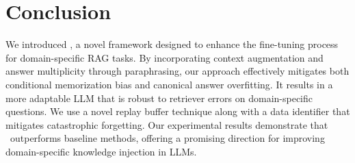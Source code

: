 \section{Conclusion}\label{sec:conclusion}
We introduced \ourmethodshort, a novel framework designed to enhance the fine-tuning process for domain-specific RAG tasks. By incorporating context augmentation and answer multiplicity through paraphrasing,
our approach effectively mitigates both conditional memorization bias and canonical answer overfitting. 
It results in a more adaptable LLM that is robust to retriever errors on domain-specific questions.
We use a novel replay buffer technique along with a data identifier that mitigates catastrophic forgetting.
Our experimental results demonstrate that \ourmethodshort\ outperforms baseline methods, offering a promising direction for improving domain-specific knowledge injection in LLMs.